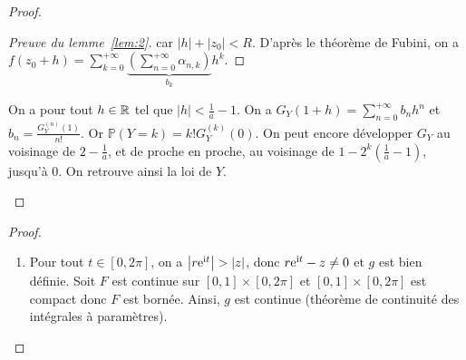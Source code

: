 \documentclass[12pt]{article}
\begin{document}
\begin{proof}
\begin{enumerate}
\begin{proof}[Preuve du lemme~\ref{lem:2}]
            car $\left\lvert h\right\rvert+\left\lvert z_{0}\right\rvert<R$. D'après le théorème de Fubini, on a $f(z_{0}+h)=\sum_{k=0}^{+\infty}\underbrace{\left(\sum_{n=0}^{+\infty}\alpha_{n,k}\right)}_{b_k}h^{k}$.
        \end{proof}

        On a pour tout $h\in\mathbb{R}$ tel que $\left\lvert h\right\rvert<\frac{1}{a}-1$. On a $G_Y(1+h)=\sum_{n=0}^{+\infty}b_nh^{n}$ et $b_n=\frac{G_Y^{(n)}(1)}{n!}$. Or $\mathbb{P}(Y=k)=k!G_Y^{(k)}(0)$. On peut encore développer $G_Y$ au voisinage de $2-\frac{1}{a}$, et de proche en proche, au voisinage de $1-2^{k}\left(\frac{1}{a}-1\right)$, jusqu'à 0. On retrouve ainsi la loi de $Y$.
    \end{enumerate}
\end{proof}

\begin{proof}
    \phantom{}
    \begin{enumerate}
        \item Pour tout $t\in[0,2\pi]$, on a $\left\lvert r\mathrm{e}^{\mathrm{i} t}\right\rvert>\left\lvert z\right\rvert$, donc $r\mathrm{e}^{\mathrm{i} t}-z\neq0$ et $g$ est bien définie. Soit 
        $F$ est continue sur $[0,1]\times[0,2\pi]$ et $[0,1]\times[0,2\pi]$ est compact donc $F$ est bornée. Ainsi, $g$ est continue (théorème de continuité des intégrales à paramètres). 


\end{enumerate}
\end{proof}
\end{document}
